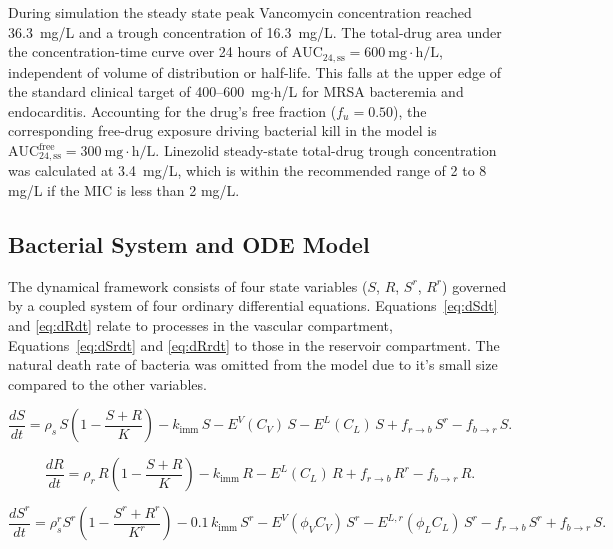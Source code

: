 \documentclass[12pt, draftcls, onecolumn]{IEEEtran}
\begin{document}
During simulation the steady state peak Vancomycin concentration reached 36.3~mg/L and a trough concentration of 16.3~mg/L.  The total-drug
area under the concentration-time curve over 24 hours of
$\mathrm{AUC}_{24,\mathrm{ss}} = 600~\mathrm{mg\cdot h/L}$,
independent of volume of distribution or half-life. This falls at the upper
edge of the standard clinical target of 400--600~mg$\cdot$h/L for MRSA
bacteremia and endocarditis\cite{rybak2020therapeutic}. Accounting for the drug's free fraction
($f_u = 0.50$), the corresponding free-drug exposure driving bacterial kill
in the model is $\mathrm{AUC}_{24,\mathrm{ss}}^{\text{free}} = 300~\mathrm{mg\cdot h/L}$.  Linezolid steady-state total-drug trough concentration was calculated at 3.4~mg/L, which is within the recommended range of 2 to 8 mg/L if the MIC is less than 2 mg/L\cite{alsultan2019determining}. 


\subsection{Bacterial System and ODE Model}
The dynamical framework consists of four state variables 
($S$, $R$, $S^r$, $R^r$) governed by a coupled system of four ordinary differential equations. Equations~\eqref{eq:dSdt} and \eqref{eq:dRdt} relate to processes in the vascular compartment, Equations~\eqref{eq:dSrdt} and \eqref{eq:dRrdt} to those in the reservoir compartment.  The natural death rate of bacteria was omitted from the model due to it's small size compared to the other variables.


\begin{equation}
\label{eq:dSdt}
\frac{dS}{dt}
= \rho_{s}\, S \left( 1 - \frac{S + R}{K} \right)
- k_{\text{imm}}\, S
- E^{V}(C_V)\, S
- E^{L}(C_L)\, S
+ f_{r\to b}\, S^r - f_{b\to r}\, S .
\end{equation}


\begin{equation}
\frac{dR}{dt}
= \rho_{r}\,R \left( 1 - \frac{S + R}{K} \right)
- k_{\text{imm}}\, R
- E^{L}(C_L)\, R
+ f_{r\to b}\, R^r - f_{b\to r}\, R .
\label{eq:dRdt}
\end{equation}



\begin{equation}
\frac{dS^r}{dt}
= \rho_{s}^{r} S^{r} \left( 1 - \frac{S^r + R^r}{K^r} \right)
- 0.1\, k_{\text{imm}}\, S^r
- E^{V}(\phi_{V} C_V)\, S^r
- E^{L,r}(\phi_{L} C_L)\, S^r
- f_{r\to b}\, S^r + f_{b\to r}\, S .
\label{eq:dSrdt}
\end{equation}
\end{document}
